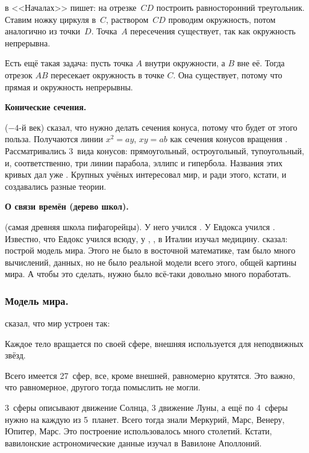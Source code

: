 \documentclass[a4paper,oneside,fleqn,10pt]{article}
\begin{document}
 в <<Началах>> пишет: на отрезке~$CD$ построить равносторонний треугольник.
Ставим ножку циркуля в~$C$, раствором~$CD$ проводим окружность, потом аналогично
из точки~$D$. Точка~$A$ пересечения существует, так как окружность непрерывна.

Есть ещё такая задача: пусть точка $A$ внутри окружности, а $B$ вне её. Тогда отрезок $AB$ пересекает
окружность в точке $C$. Она существует, потому что прямая и окружность непрерывны.

\textbf{Конические сечения.}

 ($-4$-й век) сказал, что нужно делать сечения конуса, потому что будет от этого польза.
Получаются линии $x^2 = ay$, $xy = ab$ как сечения конусов вращения .
Рассматривались 3~вида конусов: прямоугольный, остроугольный, тупоугольный, и, соответственно, три линии
парабола, эллипс и гипербола. Названия этих кривых дал уже . Крупных учёных интересовал мир, и ради этого,
кстати, и создавались разные теории.

\textbf{О связи времён (дерево школ).}

 (самая древняя школа пифагорейцы). У него учился .
У Евдокса учился . Известно, что Евдокс учился всюду, у ,
, в Италии изучал медицину.  сказал:
построй модель мира. Этого не было в восточной математике,
там было много вычислений, данных, но не было реальной модели всего этого, общей картины мира.
А чтобы это сделать, нужно было всё-таки довольно много поработать.

\subsubsection{Модель мира.}

 сказал, что мир устроен так:

\begin{items}{-2}
\item Каждое тело вращается по своей сфере, внешняя используется для неподвижных звёзд.
\item Всего имеется 27~сфер, все, кроме внешней, равномерно крутятся. Это важно, что равномерное,
другого тогда помыслить не могли.
\item 3~сферы описывают движение Солнца, 3 движение Луны, а ещё по 4~сферы нужно на каждую из 5~планет.
Всего тогда знали Меркурий, Марс, Венеру, Юпитер, Марс. Это построение использовалось
много столетий. Кстати, вавилонские астрономические данные изучал в Вавилоне Аполлоний.
\end{items}
\end{document}
